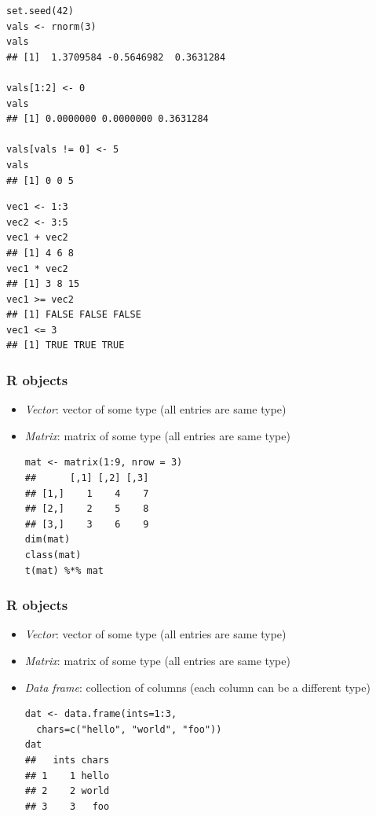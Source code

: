 \documentclass[10pt,c]{beamer}
\newenvironment{changemargin}[1]{
  \begin{list}{}{
    \setlength{\topsep}{0pt}
    \setlength{\leftmargin}{#1}
    \setlength{\rightmargin}{#1}
    \setlength{\listparindent}{\parindent}
    \setlength{\itemindent}{\parindent}
    \setlength{\parsep}{\parskip}
  }
  \item[]}{\end{list}}
\begin{document}
\begin{frame}
\begin{changemargin}{-1.0em}
\begin{lstlisting}
set.seed(42)
vals <- rnorm(3)
vals
## [1]  1.3709584 -0.5646982  0.3631284

vals[1:2] <- 0
vals
## [1] 0.0000000 0.0000000 0.3631284

vals[vals != 0] <- 5
vals
## [1] 0 0 5
\end{lstlisting}
\end{changemargin}
\end{frame}
\begin{frame}
\begin{changemargin}{2.5em}
\begin{lstlisting}
vec1 <- 1:3
vec2 <- 3:5
vec1 + vec2
## [1] 4 6 8
vec1 * vec2
## [1] 3 8 15
vec1 >= vec2
## [1] FALSE FALSE FALSE
vec1 <= 3
## [1] TRUE TRUE TRUE
\end{lstlisting}
\end{changemargin}
\end{frame}
\begin{frame}[fragile]
\frametitle{R objects}
\begin{itemize}
\item \emph{Vector}: vector of some type (all entries are same type)
\item \emph{Matrix}: matrix of some type (all entries are same type)
\begin{lstlisting}
mat <- matrix(1:9, nrow = 3)
##      [,1] [,2] [,3]
## [1,]    1    4    7
## [2,]    2    5    8
## [3,]    3    6    9
dim(mat)
class(mat)
t(mat) %*% mat
\end{lstlisting}
\end{itemize}
\end{frame}
\begin{frame}[fragile]
\frametitle{R objects}
\begin{itemize}
\item \emph{Vector}: vector of some type (all entries are same type)
\item \emph{Matrix}: matrix of some type (all entries are same type)
\item \emph{Data frame}: collection of columns (each column can be a different type)
\begin{lstlisting}
dat <- data.frame(ints=1:3,
  chars=c("hello", "world", "foo"))
dat
##   ints chars
## 1    1 hello
## 2    2 world
## 3    3   foo
\end{lstlisting}
\end{itemize}
\end{frame}
\end{document}

